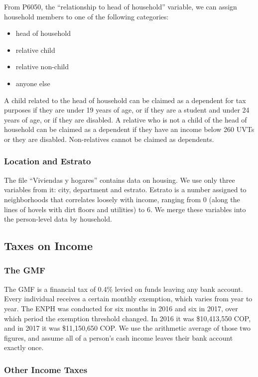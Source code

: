 \documentclass[12pt]{article}
\begin{document}
\begin{appendices}
From P6050, the ``relationship to head of household'' variable,
we can assign household members to one of the following categories:
\begin{itemize}
\item head of household
\item relative child
\item relative non-child
\item anyone else
\end{itemize}

A child related to the head of household can be claimed as a dependent for tax purposes if they are under 19 years of age, or if they are a student and under 24 years of age, or if they are disabled.
A relative who is not a child of the head of household can be claimed as a dependent if they have an income below 260 UVTs or they are disabled. Non-relatives cannot be claimed as dependents.


\subsubsection{Location and Estrato}

The file ``Viviendas y hogares'' contains data on housing.
We use only three variables from it: city, department and estrato.
Estrato is a number assigned to neighborhoods that correlates loosely with income,
ranging from 0 (along the lines of hovels with dirt floors and utilities) to 6.
We merge these variables into the person-level data by household.

\subsection{Taxes on Income}

\subsubsection{The GMF}

The GMF is a financial tax of 0.4\% levied on funds leaving any bank account.
Every individual receives a certain monthly exemption, which varies from year to year.
The ENPH was conducted for six months in 2016 and six in 2017, over which period the exemption threshold changed.
In 2016 it was \$10,413,550 COP, and in 2017 it was \$11,150,650 COP.
We use the arithmetic average of those two figures,
and assume all of a person's cash income leaves their bank account exactly once.

\subsubsection{Other Income Taxes}


\end{appendices}
\end{document}
